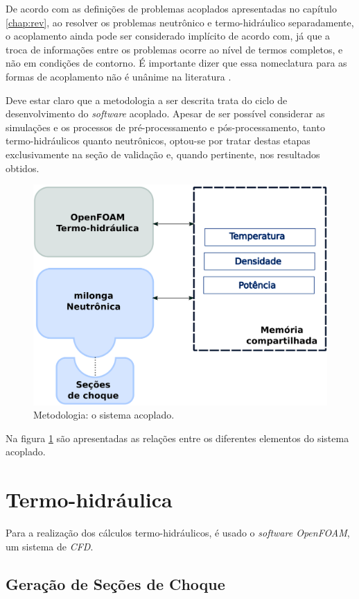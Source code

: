 De acordo com as definições de problemas acoplados apresentadas
no capítulo \ref{chap:rev}, ao resolver os problemas neutrônico e termo-hidráulico
separadamente, o acoplamento ainda pode ser considerado implícito de acordo com, já que a troca de informações entre os problemas ocorre ao nível de termos completos,
e não em condições de contorno. É importante dizer que essa nomeclatura para as formas
de acoplamento não é unânime na literatura \cite{Ivanov2007}.

Deve estar claro que a metodologia a ser descrita trata do ciclo de desenvolvimento
do \textit{software} acoplado. Apesar de ser possível considerar as simulações e
os processos de pré-processamento e pós-processamento, tanto termo-hidráulicos quanto
neutrônicos, optou-se por tratar destas etapas exclusivamente na seção de validação e,
quando pertinente, nos resultados obtidos.

\begin{figure}[h]
  \centering\includegraphics[scale=0.7]{figuras/metodologia1.png}
  \caption{Metodologia: o sistema acoplado.}
  \label{metodoetapas}
\end{figure}

Na figura \ref{metodoetapas} são apresentadas as relações entre os diferentes elementos
do sistema acoplado.



\section{Termo-hidráulica}
\label{sec:th}

Para a realização dos cálculos termo-hidráulicos, é usado o \textit{software OpenFOAM},
um sistema de \textit{CFD}.

\subsection{Geração de Seções de Choque}
\label{sub:xs}

